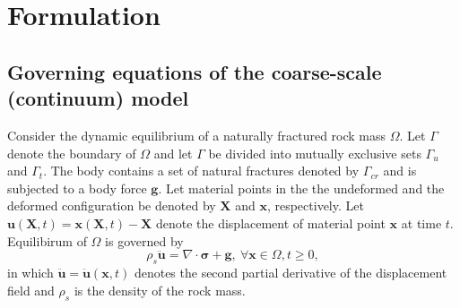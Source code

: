 \section{Formulation}

\subsection{Governing equations of the coarse-scale (continuum) model}
Consider the dynamic equilibrium of a naturally fractured rock mass $\Omega$. Let $\Gamma$ denote the boundary of $\Omega$ and let $\Gamma$ be divided into mutually exclusive sets $\Gamma_u$ and $\Gamma_t$.   The body contains a set of natural fractures denoted by $\Gamma_{cr}$ and is subjected to a body force $\mathbf{g}$.  Let material points in the the undeformed and the deformed configuration be denoted by $\mathbf{X}$ and $\mathbf{x}$, respectively. Let $\mathbf{u}\left(\mathbf{X}, t\right)=\mathbf{x}\left(\mathbf{X}, t\right)-\mathbf{X}$ denote the displacement of material point $\mathbf{x}$ at time $t$.    Equilibirum of $\Omega$ is governed by
\begin{equation}
\label{eqn:equil}
\rho_s \ddot{\mathbf{u}} =\nabla \cdot \boldsymbol{\sigma} +\mathbf{g},\:\forall \mathbf{x}\in\Omega, t\geq0,
\end{equation}
in which $\ddot{\mathbf{u}}=\ddot{\mathbf{u}}\left(\mathbf{x}, t\right)$ denotes the second partial derivative of the displacement field and $\rho_s$ is the density of the rock mass. 

